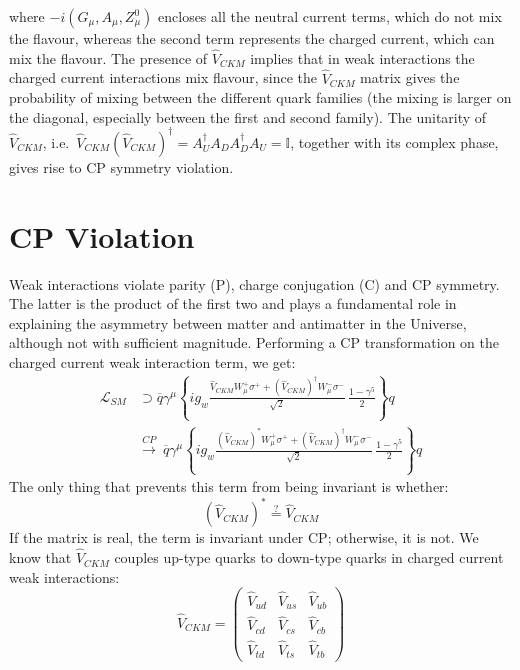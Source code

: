 \documentclass[11pt,a4paper,twoside,openright]{report}
\newcommand{\ccterm}[1]{%
  \overline{q}\gamma^\mu\left\{ig_w\frac{#1}{\sqrt{2}}\,\frac{1-\gamma^5}{2}\right\}q}
\begin{document}
where \(- i(G_\mu,A_\mu,Z^0_\mu)\) encloses all the neutral current terms, which do not mix the flavour, whereas the second term represents the charged current, which can mix the flavour. The presence of \(\hat{V}_{CKM}\) implies that in weak interactions the charged current interactions mix flavour, since the \(\hat{V}_{CKM}\) matrix gives the probability of mixing between the different quark families (the mixing is larger on the diagonal, especially between the first and second family). The unitarity of \(\hat{V}_{CKM}\), i.e.\ \(\hat{V}_{CKM}(\hat{V}_{CKM})^\dagger=A^\dagger_U A_D A^\dagger_D A_U=\mathbb{I}\), together with its complex phase, gives rise to CP symmetry violation.

\section{CP Violation}
\label{cp_violation}
Weak interactions violate parity (P), charge conjugation (C) and CP symmetry. The latter is the product of the first two and plays a fundamental role in explaining the asymmetry between matter and antimatter in the Universe, although not with sufficient magnitude. Performing a CP transformation on the charged current weak interaction term, we get:
\begin{equation}
\begin{aligned}
\mathcal{L}_{SM} &\supset
  \ccterm{\hat{V}_{CKM}W^+_\mu\sigma^+ + (\hat{V}_{CKM})^\dagger W^-_\mu\sigma^-} \\[0.5cm]
&\overset{CP}{\longrightarrow}\
  \ccterm{(\hat{V}_{CKM})^*W^+_\mu\sigma^+ + (\hat{V}_{CKM})^\dagger W^-_\mu\sigma^-}
\end{aligned}
\end{equation}
The only thing that prevents this term from being invariant is whether:
\begin{equation}
(\hat{V}_{CKM})^*\overset{?}{=}\hat{V}_{CKM}
\end{equation}
If the matrix is real, the term is invariant under CP; otherwise, it is not.
We know that \(\hat{V}_{CKM}\) couples up-type quarks to down-type quarks in charged current weak interactions:
\begin{equation}
\hat{V}_{CKM}=\begin{pmatrix} \hat{V}_{ud} & \hat{V}_{us} & \hat{V}_{ub} \\ \hat{V}_{cd} & \hat{V}_{cs} & \hat{V}_{cb} \\ \hat{V}_{td} & \hat{V}_{ts} & \hat{V}_{tb} \end{pmatrix}
\end{equation}
\end{document}
